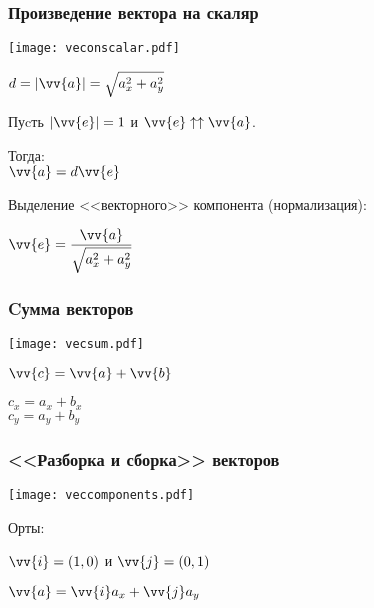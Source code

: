 \documentclass[10pt]{beamer}
\begin{document}
    \begin{frame}\frametitle{Произведение вектора на скаляр}
    {
    	{
    		
			\texttt{[image: veconscalar.pdf]}
    		
    		
    	}
    	{
    		$d = |\vv{a}| = \sqrt{a_x^2 + a_y^2}$
    		
    		\hfill 
    		
    		Пуcть $|\vv{e}| = 1$ и $\vv{e} \uparrow \uparrow \vv{a} $.
    		
    		Тогда: \\
    		$\vv{a} = d\vv{e}$ 
    		
    		\hfill
    		
    		{\scriptsize Выделение <<векторного>> компонента (нормализация):}
    		
    		$\vv{e} = \displaystyle\frac{\vv{a}}{\sqrt{a_x^2 + a_y^2}}$
    		
    	
    	}
    	
    }
\end{frame}
    
    
    
    
   \begin{frame}\frametitle{Cумма векторов}
    {
    	{
    		
    		\texttt{[image: vecsum.pdf]}    		
    		
    	}
    	{
    		$\vv{c} = \vv{a} + \vv{b}$
    		
    		\hfill
    		
    		$c_x = a_x + b_x$\\
    		$c_y = a_y + b_y$
    		
    	}
    	
    }
	\end{frame}
    
    \begin{frame}\frametitle{<<Разборка и сборка>> векторов}
    {
    	{
    		
    		\texttt{[image: veccomponents.pdf]}
    		
    		
    	}
    	{
    		Орты:
    		
    		$\vv{i} = (1,0)$ и 	$\vv{j} = (0,1)$
    		
    		\hfill
    		
    		$\vv{a} = \vv{i}a_x+\vv{j}a_y$
    		
    	}
    	
    }
	\end{frame}
	
\end{document}
